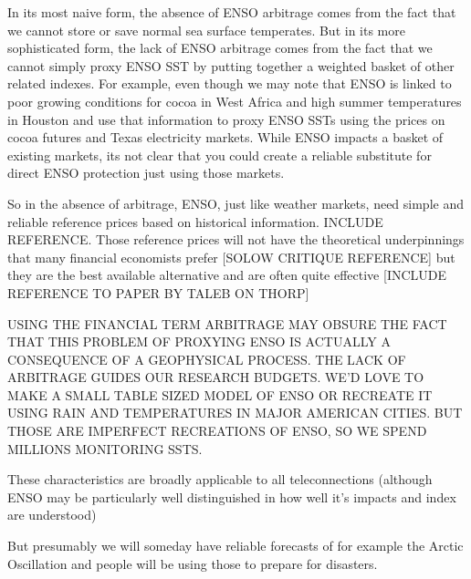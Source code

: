\documentclass[authoryear]{article}
\begin{document}
\begin{itemize}
In its most naive form, the absence of ENSO arbitrage comes from the fact that we cannot store or save normal sea surface temperates. But in its more sophisticated form, the lack of ENSO arbitrage comes from the fact that we cannot simply proxy ENSO SST by putting together a weighted basket of other related indexes. For example, even though we may note that ENSO is linked to poor growing conditions for cocoa in West Africa and high summer temperatures in Houston and use that information to proxy ENSO SSTs using the prices on cocoa futures and Texas electricity markets. While ENSO impacts a basket of existing markets, its not clear that you could create a reliable substitute for direct ENSO protection just using those markets.

So in the absence of arbitrage, ENSO, just like weather markets, need simple and reliable reference prices based on historical information. INCLUDE REFERENCE. Those reference prices will not have the theoretical underpinnings that many financial economists prefer [SOLOW CRITIQUE REFERENCE] but they are the best available alternative and are often quite effective [INCLUDE REFERENCE TO PAPER BY TALEB ON THORP]

USING THE FINANCIAL TERM ARBITRAGE MAY OBSURE THE FACT THAT THIS PROBLEM OF PROXYING ENSO IS ACTUALLY A CONSEQUENCE OF A GEOPHYSICAL PROCESS. THE LACK OF ARBITRAGE GUIDES OUR RESEARCH BUDGETS. WE'D LOVE TO MAKE A SMALL TABLE SIZED MODEL OF ENSO OR RECREATE IT USING RAIN AND TEMPERATURES IN MAJOR AMERICAN CITIES. BUT THOSE ARE IMPERFECT RECREATIONS OF ENSO, SO WE SPEND MILLIONS MONITORING SSTS.
\end{itemize}

These characteristics are broadly applicable to all teleconnections (although ENSO may be particularly well distinguished in how well it's impacts and index are understood)

But presumably we will someday have reliable forecasts of for example the Arctic Oscillation and people will be using those to prepare for disasters.
\end{document}
